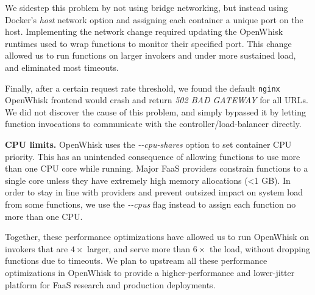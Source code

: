 We sidestep this problem by not using bridge networking, but instead using Docker's \textit{host} network option and assigning each container a unique port on the host. 
Implementing the network change required updating the OpenWhisk runtimes used to wrap functions to monitor their specified port.
This change allowed us to run functions on larger invokers and under more sustained load, and eliminated most timeouts. 

Finally, after a certain request rate threshold, we found the default \texttt{nginx} OpenWhisk frontend would crash and return \textit{502 BAD GATEWAY} for all URLs. 
We did not discover the cause of this problem, and simply bypassed it by letting function invocations to communicate with the controller/load-balancer directly. 

\noindent \textbf{CPU limits.} 
OpenWhisk uses the \textit{-{}-cpu-shares} option to set container CPU priority.
This has an unintended consequence of allowing functions to use more than one CPU core while running.
Major FaaS providers constrain functions to a single core unless they have extremely high memory allocations (<1 GB).
In order to stay in line with providers and prevent outsized impact on system load from some functions, we use the \textit{-{}-cpus} flag instead to assign each function no more than one CPU.

Together, these performance optimizations have allowed us to run OpenWhisk on invokers that are $4\times$ larger, and serve more than $6\times$ the load, without dropping functions due to timeouts.
%
We plan to upstream all these performance optimizations in OpenWhisk to provide a higher-performance and lower-jitter platform for FaaS research and production deployments. 

